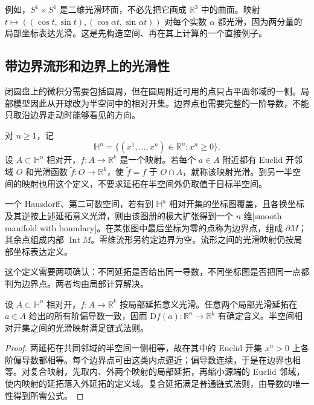 例如，\(S^1\times S^1\) 是二维光滑环面，不必先把它画成 \(\mathbb R^3\) 中的曲面。映射 \(t\mapsto((\cos t,\sin t),(\cos\alpha t,\sin\alpha t))\) 对每个实数 \(\alpha\) 都光滑，因为两分量的局部坐标表达光滑。这是先构造空间、再在其上计算的一个直接例子。

\subsection{带边界流形和边界上的光滑性}
\label{g1:subsec:1101:03}

闭圆盘上的微积分需要包括圆周，但在圆周附近可用的点只占平面邻域的一侧。局部模型因此从开球改为半空间中的相对开集。边界点也需要完整的一阶导数，不能只取沿边界走动时能够看见的方向。

\begin{definition}
	\label{g1:def:manifold-with-boundary}
	对 \(n\geq1\)，记
	\[
		\mathbb H^n=\{(x^1,\ldots,x^n)\in\mathbb R^n:x^n\geq0\}.
	\]
	设 \(A\subset\mathbb H^n\) 相对开，\(f:A\to\mathbb R^k\) 是一个映射。若每个 \(a\in A\) 附近都有 Euclid 开邻域 \(O\) 和光滑函数 \(\widetilde f:O\to\mathbb R^k\)，使 \(\widetilde f=f\) 于 \(O\cap A\)，就称该映射光滑。到另一半空间的映射也用这个定义，不要求延拓在半空间外仍取值于目标半空间。

	一个 Hausdorff、第二可数空间，若有到 \(\mathbb H^n\) 相对开集的坐标图覆盖，且各换坐标及其逆按上述延拓意义光滑，则由该图册的极大扩张得到一个 \(n\) 维[smooth manifold with boundary]。在某张图中最后坐标为零的点称为边界点，组成 \(\partial M\)；其余点组成内部 \(\operatorname{Int}M\)。零维流形另约定边界为空。流形之间的光滑映射仍按局部坐标表达定义。
\end{definition}

这个定义需要两项确认：不同延拓是否给出同一导数，不同坐标图是否把同一点都判为边界点。两者均由局部计算解决。

\begin{proposition}
	\label{g1:prop:boundary-smooth-derivative}
	设 \(A\subset\mathbb H^n\) 相对开，\(f:A\to\mathbb R^k\) 按局部延拓意义光滑。任意两个局部光滑延拓在 \(a\in A\) 给出的所有阶偏导数一致，因而 \(\mathrm{D}f(a):\mathbb R^n\to\mathbb R^k\) 有确定含义。半空间相对开集之间的光滑映射满足链式法则。
\end{proposition}

\begin{proof}
	两延拓在共同邻域的半空间一侧相等，故在其中的 Euclid 开集 \(x^n>0\) 上各阶偏导数都相等。每个边界点可由这类内点逼近；偏导数连续，于是在边界也相等。对复合映射，先取内、外两个映射的局部延拓，再缩小源端的 Euclid 邻域，使内映射的延拓落入外延拓的定义域。复合延拓满足普通链式法则，由导数的唯一性得到所需公式。
\end{proof}

